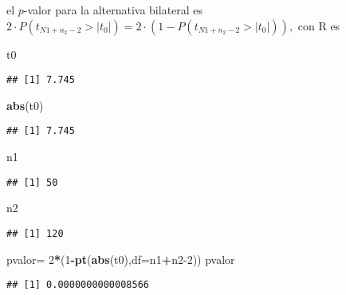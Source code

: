 \documentclass[
]{article}
\newenvironment{Shaded}{\begin{snugshade}}{\end{snugshade}}
\newcommand{\DataTypeTok}[1]{\textcolor[rgb]{0.13,0.29,0.53}{#1}}
\newcommand{\DecValTok}[1]{\textcolor[rgb]{0.00,0.00,0.81}{#1}}
\newcommand{\KeywordTok}[1]{\textcolor[rgb]{0.13,0.29,0.53}{\textbf{#1}}}
\newcommand{\NormalTok}[1]{#1}
\newcommand{\OperatorTok}[1]{\textcolor[rgb]{0.81,0.36,0.00}{\textbf{#1}}}
\newcommand{\StringTok}[1]{\textcolor[rgb]{0.31,0.60,0.02}{#1}}
\begin{document}
el \(p\)-valor para la alternativa bilateral es
\(2\cdot P(t_{N1+n_2-2}>|t_0|)=2\cdot (1-P(t_{N1+n_2-2}>|t_0|)),\) con R
es

\begin{Shaded}
\begin{Highlighting}[]
\NormalTok{t0}
\end{Highlighting}
\end{Shaded}

\begin{verbatim}
## [1] 7.745
\end{verbatim}

\begin{Shaded}
\begin{Highlighting}[]
\KeywordTok{abs}\NormalTok{(t0)}
\end{Highlighting}
\end{Shaded}

\begin{verbatim}
## [1] 7.745
\end{verbatim}

\begin{Shaded}
\begin{Highlighting}[]
\NormalTok{n1}
\end{Highlighting}
\end{Shaded}

\begin{verbatim}
## [1] 50
\end{verbatim}

\begin{Shaded}
\begin{Highlighting}[]
\NormalTok{n2}
\end{Highlighting}
\end{Shaded}

\begin{verbatim}
## [1] 120
\end{verbatim}

\begin{Shaded}
\begin{Highlighting}[]
\NormalTok{pvalor=}\StringTok{ }\DecValTok{2}\OperatorTok{*}\NormalTok{(}\DecValTok{1}\OperatorTok{{-}}\KeywordTok{pt}\NormalTok{(}\KeywordTok{abs}\NormalTok{(t0),}\DataTypeTok{df=}\NormalTok{n1}\OperatorTok{+}\NormalTok{n2}\DecValTok{{-}2}\NormalTok{))}
\NormalTok{pvalor}
\end{Highlighting}
\end{Shaded}

\begin{verbatim}
## [1] 0.0000000000008566
\end{verbatim}
\end{document}
